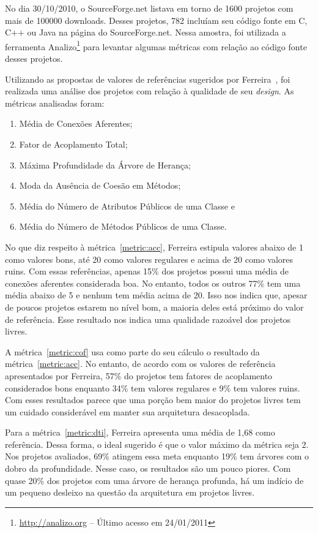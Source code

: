 No dia 30/10/2010, o SourceForge.net listava em torno de 1600 projetos
com mais de 100000 downloads. Desses projetos, 782 incluíam seu código
fonte em C, C++ ou Java na página do SourceForge.net.  Nessa amostra,
foi utilizada a ferramenta Analizo\footnote{\url{http://analizo.org}
  -- Último acesso em 24/01/2011} \cite{Terceiro2010} para levantar
algumas métricas com relação ao código fonte desses projetos.

Utilizando as propostas de valores de referências sugeridos por
Ferreira~\cite{Ferreira2009}, foi realizada uma análise dos projetos
com relação à qualidade de seu \textit{design}. As métricas analisadas
foram:
\begin{enumerate}
\item Média de Conexões Aferentes;
  \label{metric:acc}
\item Fator de Acoplamento Total;
  \label{metric:cof}
\item Máxima Profundidade da Árvore de Herança;
  \label{metric:dti}
\item Moda da Ausência de Coesão em Métodos;
  \label{metric:lcom}
\item Média do Número de Atributos Públicos de uma Classe e
  \label{metric:npa}
\item Média do Número de Métodos Públicos de uma Classe.
  \label{metric:npm}
\end{enumerate}

No que diz respeito à métrica~\ref{metric:acc}, Ferreira estipula
valores abaixo de 1 como valores bons, até 20 como valores regulares e
acima de 20 como valores ruins. Com essas referências, apenas 15\% dos
projetos possui uma média de conexões aferentes considerada boa. No
entanto, todos os outros 77\% tem uma média abaixo de 5 e nenhum tem
média acima de 20. Isso nos indica que, apesar de poucos projetos
estarem no nível bom, a maioria deles está próximo do valor de
referência. Esse resultado nos indica uma qualidade razoável dos
projetos livres.

A métrica~\ref{metric:cof} usa como parte do seu cálculo o resultado
da métrica~\ref{metric:acc}. No entanto, de acordo com os valores de
referência apresentados por Ferreira, 57\% do projetos tem fatores de
acoplamento considerados bons enquanto 34\% tem valores regulares e
9\% tem valores ruins. Com esses resultados parece que uma porção bem
maior do projetos livres tem um cuidado considerável em manter sua
arquitetura desacoplada.

Para a métrica~\ref{metric:dti}, Ferreira apresenta uma média de 1,68
como referência. Dessa forma, o ideal sugerido é que o valor máximo da
métrica seja 2. Nos projetos avaliados, 69\% atingem essa meta
enquanto 19\% tem árvores com o dobro da profundidade. Nesse caso, os
resultados são um pouco piores. Com quase 20\% dos projetos com uma
árvore de herança profunda, há um indício de um pequeno desleixo na
questão da arquitetura em projetos livres.

